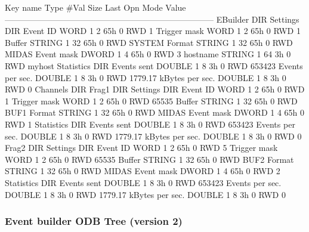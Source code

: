 \begin{DoxyCode}
Key name                        Type    #Val  Size  Last Opn Mode Value
---------------------------------------------------------------------------
EBuilder                        DIR
    Settings                    DIR
        Event ID                WORD    1     2     65h  0   RWD  1
        Trigger mask            WORD    1     2     65h  0   RWD  1
        Buffer                  STRING  1     32    65h  0   RWD  SYSTEM
        Format                  STRING  1     32    65h  0   RWD  MIDAS
        Event mask              DWORD   1     4     65h  0   RWD  3
        hostname                STRING  1     64    3h   0   RWD  myhost
    Statistics                  DIR
        Events sent             DOUBLE  1     8     3h   0   RWD  653423
        Events per sec.         DOUBLE  1     8     3h   0   RWD  1779.17
        kBytes per sec.         DOUBLE  1     8     3h   0   RWD  0
    Channels                    DIR
        Frag1                   DIR
            Settings            DIR
                Event ID        WORD    1     2     65h  0   RWD  1
                Trigger mask    WORD    1     2     65h  0   RWD  65535
                Buffer          STRING  1     32    65h  0   RWD  BUF1
                Format          STRING  1     32    65h  0   RWD  MIDAS
                Event mask      DWORD   1     4     65h  0   RWD  1
            Statistics          DIR
                Events sent     DOUBLE  1     8     3h   0   RWD  653423
                Events per sec. DOUBLE  1     8     3h   0   RWD  1779.17
                kBytes per sec. DOUBLE  1     8     3h   0   RWD  0
        Frag2                   DIR
            Settings            DIR
                Event ID        WORD    1     2     65h  0   RWD  5
                Trigger mask    WORD    1     2     65h  0   RWD  65535
                Buffer          STRING  1     32    65h  0   RWD  BUF2
                Format          STRING  1     32    65h  0   RWD  MIDAS
                Event mask      DWORD   1     4     65h  0   RWD  2
            Statistics          DIR
                Events sent     DOUBLE  1     8     3h   0   RWD  653423
                Events per sec. DOUBLE  1     8     3h   0   RWD  1779.17
                kBytes per sec. DOUBLE  1     8     3h   0   RWD  0
\end{DoxyCode}
\hypertarget{FE_Event_Builder_FE_eb_tree_2}{}\subsubsection{Event builder ODB Tree (version 2)}\label{FE_Event_Builder_FE_eb_tree_2}
